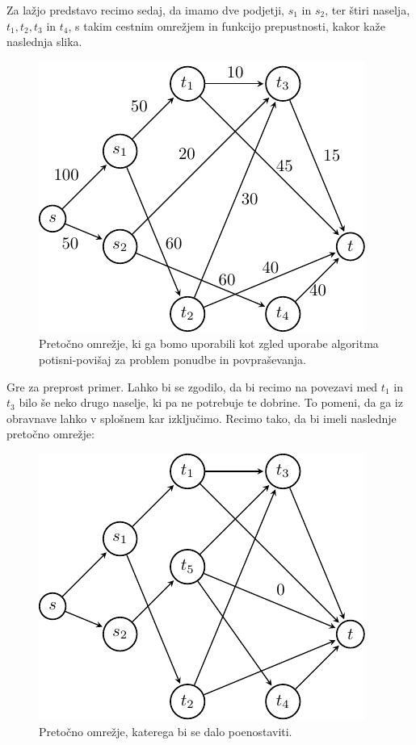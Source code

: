 \documentclass[mat1]{fmfdelo}
\begin{document}
Za lažjo predstavo recimo sedaj, da imamo dve podjetji, $s_1$ in $s_2$, ter štiri naselja, $t_1, t_2, t_3$ in $t_4$, s takim cestnim omrežjem in funkcijo prepustnosti, kakor kaže
naslednja slika.

\begin{figure}[H]
  \centering
  \includegraphics{images/primer1-1.pdf}
  \caption{Pretočno omrežje, ki ga bomo uporabili kot zgled uporabe algoritma potisni-povišaj za problem ponudbe in povpraševanja.}
\end{figure}

Gre za preprost primer. Lahko bi se zgodilo, da bi recimo na povezavi med $t_1$ in $t_3$ bilo še neko drugo naselje, ki pa ne potrebuje te dobrine. To pomeni,
da ga iz obravnave lahko v splošnem kar izključimo. Recimo tako, da bi imeli naslednje pretočno omrežje:

\begin{figure}[H]
  \centering
  \includegraphics{images/primer1-2.pdf}
  \caption{Pretočno omrežje, katerega bi se dalo poenostaviti.}
\end{figure}
\end{document}
